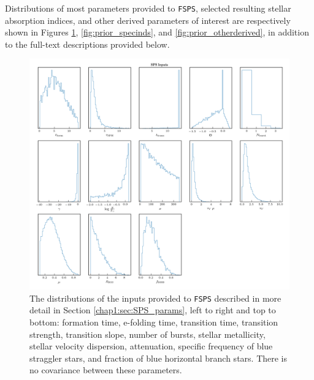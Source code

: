 Distributions of most parameters provided to \texttt{FSPS}, selected resulting stellar absorption indices, and other derived parameters of interest are respectively shown in Figures \ref{fig:prior_inputparams}, \ref{fig:prior_specinds}, and \ref{fig:prior_otherderived}, in addition to the full-text descriptions provided below.

\begin{figure}
    \centering
    \includegraphics[width=\textwidth]{prior_inputparams}
    \caption[Distributions of stellar population synthesis inputs]{\fixspacing The distributions of the inputs provided to \texttt{FSPS} described in more detail in Section \ref{chap1:sec:SPS_params}, left to right and top to bottom: formation time, e-folding time, transition time, transition strength, transition slope, number of bursts, stellar metallicity, stellar velocity dispersion, attenuation, specific frequency of blue straggler stars, and fraction of blue horizontal branch stars. There is no covariance between these parameters.}
    \label{fig:prior_inputparams}
\end{figure}

